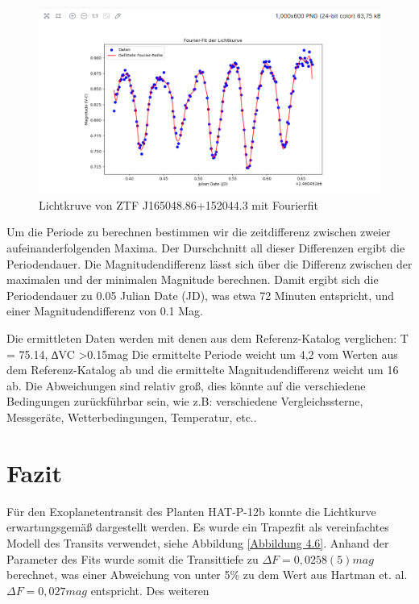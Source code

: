 \documentclass[ngerman,ruledheaders=section,class=report,thesis={type=Protokoll},accentcolor=1b,marginpar=false,parskip=half-,fontsize=11pt,]{tudapub}
\begin{document}
	\begin{figure}[h]
		\centering
		\includegraphics[width=0.8\linewidth]{LK_Fit}
		\caption{Lichtkruve von ZTF J165048.86+152044.3 mit Fourierfit}
		\label{Abbildung 4.44}
	\end{figure}

Um die Periode zu berechnen bestimmen wir die zeitdifferenz zwischen zweier aufeinanderfolgenden Maxima. Der Durschchnitt all dieser Differenzen ergibt die Periodendauer.
Die Magnitudendifferenz lässt sich über die Differenz zwischen der maximalen und der minimalen Magnitude berechnen.
Damit ergibt sich die Periodendauer zu 0.05 Julian Date (JD), was etwa 72 Minuten entspricht, und einer Magnitudendifferenz von 0.1 Mag.

Die ermittleten Daten werden mit denen aus dem Referenz-Katalog verglichen: T = 75.14, ∆VC >0.15mag
Die ermittelte Periode weicht um 4,2 vom Werten aus dem Referenz-Katalog ab und die ermittelte
Magnitudendifferenz weicht um 16 ab. Die Abweichungen sind relativ groß, dies könnte auf die verschiedene Bedingungen zurückführbar sein, wie z.B: verschiedene Vergleichssterne, Messgeräte, Wetterbedingungen, Temperatur, etc..


	\chapter{Fazit}
Für den Exoplanetentransit des Planten HAT-P-12b konnte die Lichtkurve erwartungsgemäß dargestellt werden. 
Es wurde ein Trapezfit als vereinfachtes Modell des Transits verwendet, siehe Abbildung \ref*{Abbildung 4.6}.
Anhand der Parameter des Fits wurde somit die Transittiefe zu $\Delta F = 0,0258(5)\si{mag}$ berechnet, was einer Abweichung von unter 5\% 
zu dem Wert aus Hartman et. al. \cite*{hartman2009hat} $\Delta F= 0,027\si{mag}$ entspricht.
Des weiteren 
	
	\printbibliography
	
	
\end{document}
